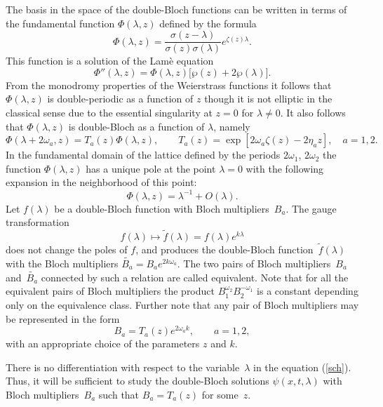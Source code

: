 \documentclass[a4paper,11pt]{article}
\newcommand{\wt}{\widetilde}
\theoremstyle{plain}
\theoremstyle{remark}
\begin{document}
The basis in the space of the double-Bloch functions can be written
in terms of the fundamental function $\Phi(\lambda,z)$ defined by
the formula
\begin{equation}\label{phi}
\Phi(\lambda,z)=\frac{\sigma(z-\lambda)}{\sigma(z)\sigma(\lambda)}
e^{\zeta(z)\lambda} .
\end{equation}
This function is a solution of the Lam\`e equation
\begin{equation}
\Phi''(\lambda,z)=\Phi(\lambda,z) \bigl[ \wp(z)+2\wp(\lambda) \bigr] .
\end{equation}
From the monodromy properties of the Weierstrass functions it follows
that $\Phi(\lambda,z)$ is double-periodic as a function of $z$
though it is not elliptic in the classical sense due to the essential
singularity at $z=0$ for $\lambda\ne 0$. It also follows that
$\Phi(\lambda,z)$ is double-Bloch as a function of $\lambda$, namely
$$
\Phi(\lambda+2\omega_a,z)=T_a(z) \Phi(\lambda,z),\qquad
T_a(z)=\exp\left[ 2\omega_a\zeta(z)-2\eta_a z \right],\quad a=1,2.
$$
In the fundamental domain of the lattice defined by the periods $2\omega_1$,
$2\omega_2$ the function $\Phi(\lambda,z)$ has a unique pole at the point
$\lambda=0$ with the following expansion in the neighborhood of this point:
\begin{equation}\label{phil}
\Phi(\lambda,z)=\lambda^{-1}+O(\lambda) .
\end{equation}
Let $f(\lambda)$ be a double-Bloch function with Bloch multipliers~$B_a$.
The gauge transformation
$$
f(\lambda)\longmapsto \wt f(\lambda)=f(\lambda) e^{k\lambda}
$$
does not change the poles of $f$, and produces the double-Bloch
function~$\wt f(\lambda)$ with the Bloch multipliers
$\wt{B_a}=B_a e^{2k \omega_a}$.
The two pairs of Bloch multipliers~$B_a$ and~$\wt{B_a}$ connected by
such a relation are called equivalent. Note that for all the equivalent
pairs of Bloch multipliers the product $B_1^{\omega_2} B_2^{-\omega_1}$
is a constant depending only on the equivalence class.
Further note that any pair of Bloch multipliers may be represented in
the form
$$
B_a=T_a(z) e^{2\omega_a k},\qquad a=1,2,
$$
with an appropriate choice of the parameters $z$ and $k$.

There is no differentiation with respect to the variable~$\lambda$
in the equation (\ref{sch}). Thus, it will be sufficient to
study the double-Bloch solutions $\psi(x,t,\lambda)$ with
Bloch multipliers~$B_a$ such that $B_a=T_a(z)$ for some~$z$.
\end{document}
